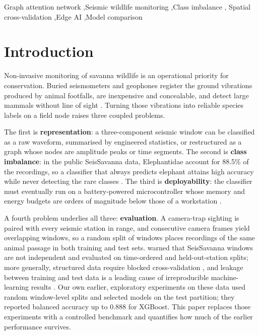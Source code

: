 \documentclass[a4paper,fleqn]{cas-dc}
\begin{document}
\begin{keywords}
Graph attention network \sep Seismic wildlife monitoring \sep Class imbalance \sep
Spatial cross-validation \sep Edge AI \sep Model comparison
\end{keywords}

\maketitle

\section{Introduction}\label{sec:intro}
Non-invasive monitoring of savanna wildlife is an operational priority for
conservation. Buried seismometers and geophones register the ground vibrations
produced by animal footfalls, are inexpensive and concealable, and detect large
mammals without line of sight \citep{wood2005,mortimer2018,szenicer2022}. Turning those
vibrations into reliable species labels on a field node raises three coupled problems.

The first is \textbf{representation}: a three-component seismic window can be
classified as a raw waveform, summarised by engineered statistics, or restructured as a
graph whose nodes are amplitude peaks or time segments. The second is \textbf{class
imbalance}: in the public SeisSavanna data, Elephantidae account for 88.5\% of the
recordings, so a classifier that always predicts elephant attains high accuracy while
never detecting the rare classes \citep{he2009}. The third is \textbf{deployability}:
the classifier must eventually run on a battery-powered microcontroller whose memory and
energy budgets are orders of magnitude below those of a workstation
\citep{merenda2020,banbury2021}.

A fourth problem underlies all three: \textbf{evaluation}. A camera-trap sighting is
paired with every seismic station in range, and consecutive camera frames yield
overlapping windows, so a random split of windows places recordings of the same animal
passage in both training and test sets. \citet{szenicer2022} warned that SeisSavanna
windows are not independent and evaluated on time-ordered and held-out-station splits;
more generally, structured data require blocked cross-validation \citep{roberts2017}, and
leakage between training and test data is a leading cause of irreproducible
machine-learning results \citep{kapoor2023}. Our own earlier, exploratory experiments on
these data used random window-level splits and selected models on the test partition;
they reported balanced accuracy up to 0.888 for XGBoost. This paper replaces those
experiments with a controlled benchmark and quantifies how much of the earlier
performance survives.
\end{document}
